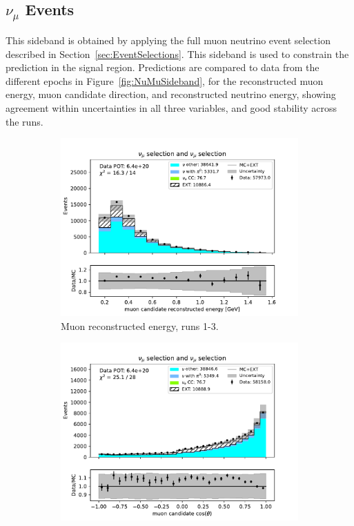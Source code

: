 \subsection{$\nu_{\mu}$ Events}
\label{sec:NuMuSideband}

This sideband is obtained by applying the full muon neutrino event selection described in Section~\ref{sec:EventSelections}. This sideband is used to constrain the prediction in the signal region. Predictions are compared to data from the different epochs in Figure~\ref{fig:NuMuSideband}, for the reconstructed muon energy, muon candidate direction, and reconstructed neutrino energy, showing agreement within uncertainties in all three variables, and good stability across the runs.

\begin{figure}[H]
    \centering
    \begin{subfigure}{0.33\linewidth}
        \captionsetup{width=0.7\linewidth}
        \includegraphics[width=\linewidth]{technote/Sidebands/Figures/NuMuSideband/muon_sideband_muon_energy_run123_NUMU_NUMU.pdf}
        \caption{Muon reconstructed energy, runs 1-3.}
    \end{subfigure}%
    \begin{subfigure}{0.33\linewidth}
        \captionsetup{width=0.6\linewidth}
        \includegraphics[width=\linewidth]{technote/Sidebands/Figures/NuMuSideband/muon_sideband_muon_theta_run123_NUMU_NUMU.pdf}

\end{subfigure}
\end{figure}
